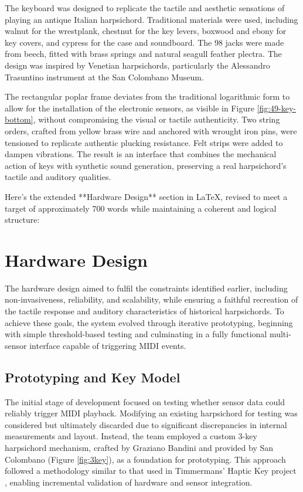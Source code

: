The keyboard was designed to replicate the tactile and aesthetic sensations of playing an antique Italian harpsichord. Traditional materials were used, including walnut for the wrestplank, chestnut for the key levers, boxwood and ebony for key covers, and cypress for the case and soundboard. The 98 jacks were made from beech, fitted with brass springs and natural seagull feather plectra. The design was inspired by Venetian harpsichords, particularly the Alessandro Trasuntino instrument at the San Colombano Museum. 

The rectangular poplar frame deviates from the traditional logarithmic form to allow for the installation of the electronic sensors, as visible in Figure \ref{fig:49-key-bottom}, without compromising the visual or tactile authenticity. Two string orders, crafted from yellow brass wire and anchored with wrought iron pins, were tensioned to replicate authentic plucking resistance. Felt strips were added to dampen vibrations. The result is an interface that combines the mechanical action of keys with synthetic sound generation, preserving a real harpsichord's tactile and auditory qualities.


Here’s the extended **Hardware Design** section in LaTeX, revised to meet a target of approximately 700 words while maintaining a coherent and logical structure:


\section{Hardware Design}\label{hardware-design}

The hardware design aimed to fulfil the constraints identified earlier, including non-invasiveness, reliability, and scalability, while ensuring a faithful recreation of the tactile response and auditory characteristics of historical harpsichords. To achieve these goals, the system evolved through iterative prototyping, beginning with simple threshold-based testing and culminating in a fully functional multi-sensor interface capable of triggering MIDI events.

\subsection{Prototyping and Key Model}

The initial stage of development focused on testing whether sensor data could reliably trigger MIDI playback. Modifying an existing harpsichord for testing was considered but ultimately discarded due to significant discrepancies in internal measurements and layout. Instead, the team employed a custom 3-key harpsichord mechanism, crafted by Graziano Bandini and provided by San Colombano (Figure \ref{fig:3key}), as a foundation for prototyping. This approach followed a methodology similar to that used in Timmermans' Haptic Key project \cite{Timmermans2020}, enabling incremental validation of hardware and sensor integration.

